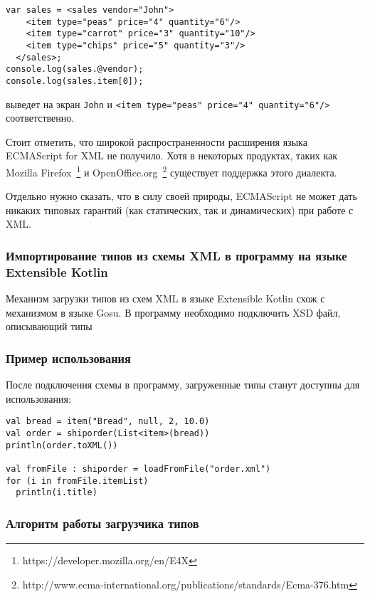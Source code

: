 \begin{description}
\begin{lstlisting}
var sales = <sales vendor="John">
    <item type="peas" price="4" quantity="6"/>
    <item type="carrot" price="3" quantity="10"/>
    <item type="chips" price="5" quantity="3"/>
  </sales>;
console.log(sales.@vendor);
console.log(sales.item[0]);
\end{lstlisting}
выведет на экран \texttt{John} и \texttt{<item type="peas" price="4" quantity="6"/>} соответственно.

Стоит отметить, что широкой распространенности расширения языка ECMAScript for XML не получило.
Хотя в некоторых продуктах, таких как Mozilla Firefox~\footnote{https://developer.mozilla.org/en/E4X} и 
OpenOffice.org~\footnote{http://www.ecma-international.org/publications/standards/Ecma-376.htm} существует поддержка этого диалекта.

Отдельно нужно сказать, что в силу своей природы, ECMAScript не может дать никаких типовых гарантий (как статических, так и динамических) при работе с XML. 

\end{description}

\subsubsection{Импортирование типов из схемы XML в программу на языке Extensible Kotlin}
Механизм загрузки типов из схем XML в языке Extensible Kotlin схож с механизмом в языке Gosu\td.
В программу необходимо подключить XSD файл, описывающий типы 
\td

\subsubsection{Пример использования}
После подключения схемы в программу, загруженные типы станут доступны для использования: \td

\begin{lstlisting}
val bread = item("Bread", null, 2, 10.0)
val order = shiporder(List<item>(bread))
println(order.toXML())

val fromFile : shiporder = loadFromFile("order.xml")
for (i in fromFile.itemList)
  println(i.title)
\end{lstlisting}

\subsubsection{Алгоритм работы загрузчика типов}

